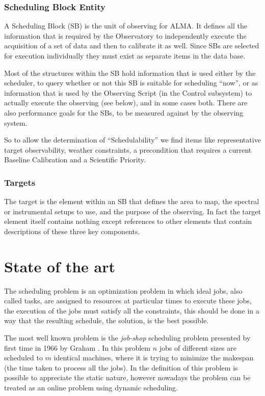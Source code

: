 \documentclass[11pt]{article}
\begin{document}
\subsubsection*{Scheduling Block Entity}
A Scheduling Block (SB) is the unit of observing for ALMA. It defines all the information that is required by the Observatory to independently execute the acquisition of a set of data and then to calibrate it as well. Since SBs are selected for execution individually they must exist as separate items in the data base.

Most of the structures within the SB hold information that is used either by the scheduler, to query whether or not this SB is suitable for scheduling ``now'', or as information that is used by the Observing Script (in the Control subsystem) to actually execute the observing (see below), and in some cases both. There are also performance goals for the SBs, to be measured against by the observing system.

So to allow the determination of ``Schedulability'' we find items like representative target observability, weather constraints, a precondition that requires a current Baseline Calibration and a Scientific Priority.

\subsubsection*{Targets}
The target is the element within an SB that defines the area to map, the spectral or instrumental setups to use, and the purpose of the observing. In fact the target element itself contains nothing except references to other elements that contain descriptions of these three key components.

\newpage
\section{State of the art}

The scheduling problem is an optimization problem in which ideal jobs, also called tasks, are assigned to resources at particular times to execute these jobs, the execution of the jobs must satisfy all the constraints, this should be done in a way that the resulting schedule, the solution, is the best possible.

The most well known problem is the \textit{job-shop} scheduling problem presented by first time in 1966 by Graham \cite{graham66}. In this problem $n$ jobs of different sizes are scheduled to $m$ identical machines, where it is trying to minimize the makespan (the time taken to process all the jobs). In the definition of this problem is possible to appreciate the static nature, however     nowadays the problem can be treated as an online problem using dynamic scheduling.
\end{document}
